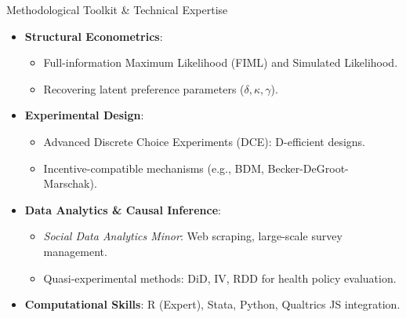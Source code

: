 \begin{frame}{Methodological Toolkit \& Technical Expertise}
    \begin{itemize}
        \item \textbf{Structural Econometrics}: 
            \begin{itemize}
                \item Full-information Maximum Likelihood (FIML) and Simulated Likelihood.
                \item Recovering latent preference parameters ($\delta, \kappa, \gamma$).
            \end{itemize}
        \item \textbf{Experimental Design}: 
            \begin{itemize}
                \item Advanced Discrete Choice Experiments (DCE): D-efficient designs.
                \item Incentive-compatible mechanisms (e.g., BDM, Becker-DeGroot-Marschak).
            \end{itemize}
        \item \textbf{Data Analytics \& Causal Inference}:
            \begin{itemize}
                \item \textit{Social Data Analytics Minor}: Web scraping, large-scale survey management.
                \item Quasi-experimental methods: DiD, IV, RDD for health policy evaluation.
            \end{itemize}
        \item \textbf{Computational Skills}: R (Expert), Stata, Python, Qualtrics JS integration.
    \end{itemize}
\end{frame}

